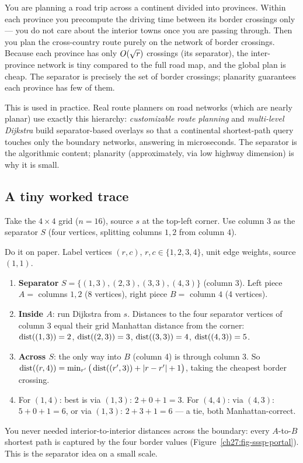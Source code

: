 \begin{intuitionbox}
You are planning a road trip across a continent divided into provinces. Within each province you precompute the driving time between its border crossings only --- you do not care about the interior towns once you are passing through. Then you plan the cross-country route purely on the network of border crossings. Because each province has only $O(\sqrt r)$ crossings (its separator), the inter-province network is tiny compared to the full road map, and the global plan is cheap. The separator is precisely the set of border crossings; planarity guarantees each province has few of them.
\end{intuitionbox}

\begin{applicationbox}
This is used in practice. Real route planners on road networks (which are nearly planar) use exactly this hierarchy: \emph{customizable route planning} and \emph{multi-level Dijkstra} build separator-based overlays so that a continental shortest-path query touches only the boundary networks, answering in microseconds. The separator is the algorithmic content; planarity (approximately, via low highway dimension) is why it is small.
\end{applicationbox}

\subsection{A tiny worked trace}

Take the $4\times 4$ grid ($n=16$), source $s$ at the top-left corner. Use column $3$ as the separator $S$ (four vertices, splitting columns $1,2$ from column $4$).

\begin{labbox}
Do it on paper. Label vertices $(r,c)$, $r,c\in\{1,2,3,4\}$, unit edge weights, source $(1,1)$.
\begin{enumerate}
  \item \textbf{Separator} $S=\{(1,3),(2,3),(3,3),(4,3)\}$ (column 3). Left piece $A=$ columns $1,2$ (8 vertices), right piece $B=$ column $4$ (4 vertices).
  \item \textbf{Inside $A$}: run Dijkstra from $s$. Distances to the four separator vertices of column 3 equal their grid Manhattan distance from the corner: $\operatorname{dist}((1,3))=2$, $\operatorname{dist}((2,3))=3$, $\operatorname{dist}((3,3))=4$, $\operatorname{dist}((4,3))=5$.
  \item \textbf{Across $S$}: the only way into $B$ (column 4) is through column 3. So $\operatorname{dist}((r,4)) = \min_{r'} \big(\operatorname{dist}((r',3)) + \lvert r-r'\rvert + 1\big)$, taking the cheapest border crossing.
  \item For $(1,4)$: best is via $(1,3)$: $2+0+1=3$. For $(4,4)$: via $(4,3)$: $5+0+1=6$, or via $(1,3)$: $2+3+1=6$ --- a tie, both Manhattan-correct.
\end{enumerate}
You never needed interior-to-interior distances across the boundary: every $A$-to-$B$ shortest path is captured by the four border values (Figure~\ref{ch27:fig-sssp-portal}). This is the separator idea on a small scale.
\end{labbox}

